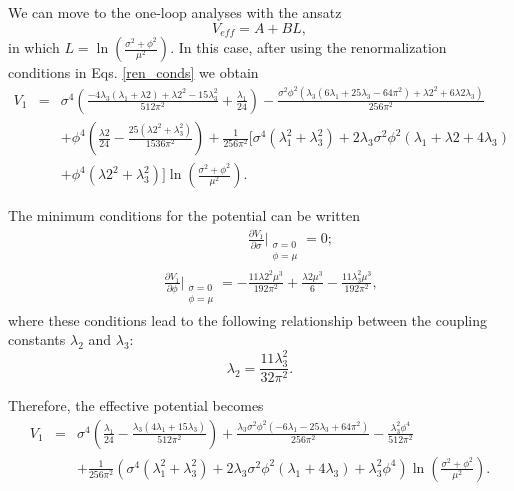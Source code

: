 \documentclass[11pt,a4paper,english,superscriptaddress,preprint,aps,prd]{revtex4}
\begin{document}
We can move to the one-loop analyses with the ansatz
\begin{equation}
 V_{eff} = A + BL,
\end{equation}
in which $L = \ln\left(\frac{\sigma^2+\phi^2}{\mu^2}\right)$. In this case, after using the renormalization conditions in Eqs. \eqref{ren_conds} we obtain
\begin{eqnarray}
 V_1 &=& \sigma ^4 \left(\frac{-4 \lambda_3 (\lambda_1+\text{$\lambda $2})+\text{$\lambda $2}^2-15 \lambda_3^2}{512 \pi ^2}+\frac{\lambda_1}{24}\right)-\frac{\sigma ^2 \phi ^2 \left(\lambda_3 \left(6 \lambda_1+25 \lambda_3-64 \pi ^2\right)+\text{$\lambda $2}^2+6 \text{$\lambda $2} \lambda_3\right)}{256 \pi ^2}\nonumber\\
 &&+\phi ^4 \left(\frac{\text{$\lambda $2}}{24}-\frac{25 \left(\text{$\lambda $2}^2+\lambda_3^2\right)}{1536 \pi ^2}\right)+\frac{1}{256 \pi ^2} \Big[\sigma ^4 \left(\lambda_1^2+\lambda_3^2\right)+2 \lambda_3 \sigma ^2 \phi ^2 (\lambda_1+\text{$\lambda $2}+4 \lambda_3)\nonumber\\
 &&+\phi ^4 \left(\text{$\lambda $2}^2+\lambda_3^2\right)\Big]\ln \left(\frac{\sigma ^2+\phi ^2}{\mu ^2}\right).
\end{eqnarray}

The minimum conditions for the potential can be written
\begin{subequations}  \begin{eqnarray}   &&\qquad\qquad\qquad\frac{\partial V_1}{\partial \sigma}\Bigr |_{\substack{\sigma=0\\\phi=\mu}} =0;\\   &&\frac{\partial V_1}{\partial \phi}\Bigr |_{\substack{\sigma=0\\\phi=\mu}} =-\frac{11 \text{$\lambda $2}^2 \mu ^3}{192 \pi ^2}+\frac{\text{$\lambda $2} \mu ^3}{6}-\frac{11 \lambda_3^2 \mu ^3}{192 \pi ^2}, \end{eqnarray} \end{subequations}
\noindent where these conditions lead to the following relationship between the coupling constants $\lambda_2$ and $\lambda_3$:
\begin{equation}
\lambda_2 = \frac{11 \lambda_3^2}{32 \pi ^2}.
\end{equation}

Therefore, the effective potential becomes
\begin{eqnarray}
 V_1 &=& \sigma ^4 \left(\frac{\lambda_1}{24}-\frac{\lambda_3 (4 \lambda_1+15 \lambda_3)}{512 \pi ^2}\right)+\frac{\lambda_3 \sigma ^2 \phi ^2 \left(-6 \lambda_1-25 \lambda_3+64 \pi ^2\right)}{256 \pi ^2}-\frac{\lambda_3^2 \phi ^4}{512 \pi ^2} \nonumber\\
 &&+ \frac{1}{256 \pi ^2}\left(\sigma ^4 \left(\lambda_1^2+\lambda_3^2\right)+2 \lambda_3 \sigma ^2 \phi ^2 (\lambda_1+4 \lambda_3)+\lambda_3^2 \phi ^4\right) \ln \left(\frac{\sigma ^2+\phi ^2}{\mu ^2}\right).
\end{eqnarray}
\end{document}
